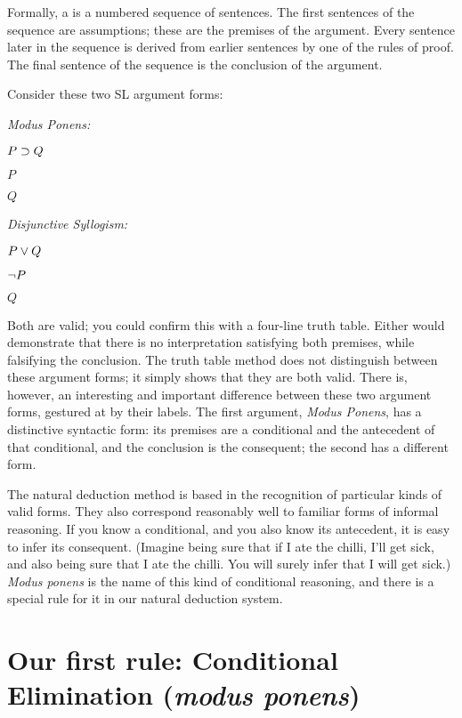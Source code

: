 Formally, a  is a numbered sequence of sentences. The first sentences of the sequence are assumptions; these are the premises of the argument. Every sentence later in the sequence is derived from earlier sentences by one of the rules of proof. The final sentence of the sequence is the conclusion of the argument.

Consider these two SL argument forms:

\begin{multicols}{2}
\emph{Modus Ponens:}
\begin{earg}
\item[] $P \supset Q$
\item[] $P$
\item[\therefore] $Q$
\end{earg}

\emph{Disjunctive Syllogism:}
\begin{earg}
\item[] $P \vee Q$
\item[] $\neg P$
\item[\therefore] $Q$
\end{earg}

\end{multicols}

Both are valid; you could confirm this with a four-line truth table. Either would demonstrate that there is no interpretation satisfying both premises, while falsifying the conclusion. The truth table method does not distinguish between these argument forms; it simply shows that they are both valid. There is, however, an interesting and important difference between these two argument forms, gestured at by their labels. The first argument, \emph{Modus Ponens}, has a distinctive syntactic form: its premises are a conditional and the antecedent of that conditional, and the conclusion is the consequent; the second has a different form.

The natural deduction method is based in the recognition of particular kinds of valid forms. They also correspond reasonably well to familiar forms of informal reasoning. If you know a conditional, and you also know its antecedent, it is easy to infer its consequent. (Imagine being sure that if I ate the chilli, I'll get sick, and also being sure that I ate the chilli. You will surely infer that I will get sick.) \emph{Modus ponens} is the name of this kind of conditional reasoning, and there is a special rule for it in our natural deduction system.

\section{Our first rule: Conditional Elimination (\emph{modus ponens})}

